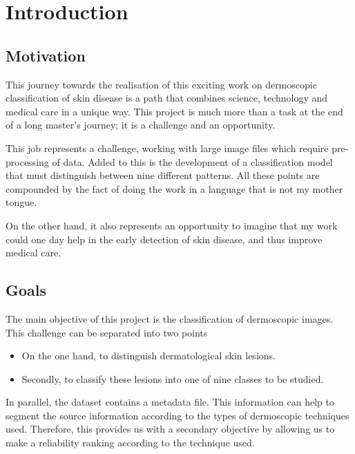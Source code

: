 \chapter{Introduction}
\label{chapter:introduction}


\section{Motivation}

This journey towards the realisation of this exciting work on dermoscopic classification of skin disease is a path that combines science, technology and medical care in a unique way. This project is much more than a task at the end of a long master's journey; it is a challenge and an opportunity.

This job represents a challenge, working with large image files which require pre-processing of data. Added to this is the development of a classification model that must distinguish between nine different patterns. All these points are compounded by the fact of doing the work in a language that is not my mother tongue.

On the other hand, it also represents an opportunity to imagine that my work could one day help in the early detection of skin disease, and thus improve medical care.


\section{Goals}


The main objective of this project is the classification of dermoscopic images. This challenge can be separated into two points

\begin{itemize}
    \item On the one hand, to distinguish dermatological skin lesions.
    \item Secondly, to classify these lesions into one of nine classes to be studied.
\end{itemize}

In parallel, the dataset contains a metadata file. This information can help to segment the source information according to the types of dermoscopic techniques used. Therefore, this provides us with a secondary objective by allowing us to make a reliability ranking according to the technique used. 


